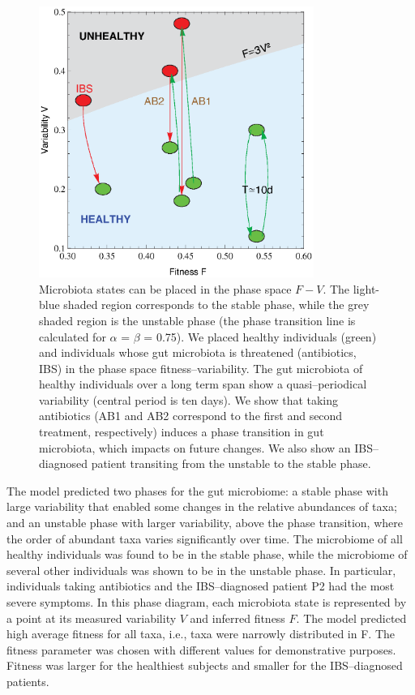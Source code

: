 \begin{figure}
	\centering
	\vspace*{-5mm} %
	\includegraphics[width=0.8\textwidth]{figs/Fig3.eps}
	\caption{Microbiota states can be placed in the phase space $F-V$. The light-blue shaded region corresponds to the stable phase, while the grey shaded region is the unstable phase (the phase transition line is calculated for  $\alpha$ = $\beta$ = 0.75). We placed healthy individuals (green) and individuals whose gut microbiota is threatened (antibiotics, IBS) in the phase space fitness--variability. The gut microbiota of healthy individuals over a long term span show a quasi--periodical variability (central period is ten days). We show that taking antibiotics (AB1 and AB2 correspond to the first and second treatment, respectively) induces a phase transition in gut microbiota, which impacts on future changes. We also show an IBS--diagnosed patient transiting from the unstable to the stable phase.}
	\label{fig:main3}
\end{figure}

The model predicted two phases for the gut microbiome: a stable phase with large variability that enabled some changes in the relative abundances of taxa; and an unstable phase with larger variability, above the phase transition, where the order of abundant taxa varies significantly over time. The microbiome of all healthy individuals was found to be in the stable phase, while the microbiome of several other individuals was shown to be in the unstable phase. In particular, individuals taking antibiotics and the IBS--diagnosed patient P2 had the most severe symptoms. In this phase diagram, each microbiota state is represented by a point at its measured variability $V$ and inferred fitness $F$. The model predicted high average fitness for all taxa, i.e., taxa were narrowly distributed in F. The fitness parameter was chosen with different values for demonstrative purposes. Fitness was larger for the healthiest subjects and smaller for the IBS--diagnosed patients.

